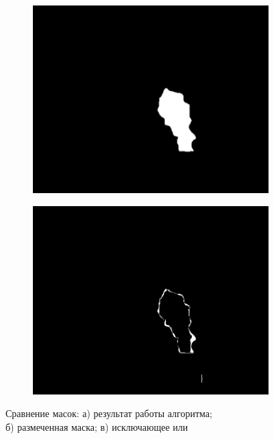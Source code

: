 \documentclass[t]{beamer}
\begin{document}
\begin{frame}
\begin{figure}[h!]
\begin{subfigure}{.30\textwidth}
				\centering
				\includegraphics[width = \textwidth]{image/examples/mask_razmet/240}
				\caption{}
			\end{subfigure}
			\begin{subfigure}{.30\textwidth}
				\centering
				\includegraphics[width = \textwidth]{image/examples/mask_dif/240}
				\caption{}
			\end{subfigure}
			\vspace{-0.3cm}
			\caption{Сравнение масок: а) результат работы алгоритма;\\ б) размеченная маска; в) исключающее или}
			\label{fig:test_segm}
		\end{figure}
	\end{frame}
\end{document}
